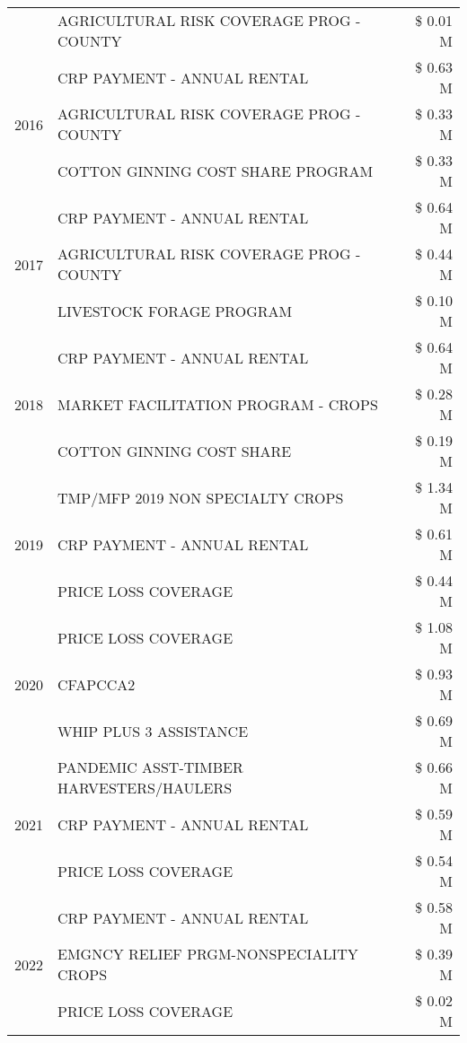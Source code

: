 \begin{tabular}{llr}
 & AGRICULTURAL RISK COVERAGE PROG - COUNTY & \$ 0.01 M \\
\cline{1-3}
\multirow[t]{3}{*}{2016} & CRP PAYMENT - ANNUAL RENTAL & \$ 0.63 M \\
 & AGRICULTURAL RISK COVERAGE PROG - COUNTY & \$ 0.33 M \\
 & COTTON GINNING COST SHARE PROGRAM & \$ 0.33 M \\
\cline{1-3}
\multirow[t]{3}{*}{2017} & CRP PAYMENT - ANNUAL RENTAL & \$ 0.64 M \\
 & AGRICULTURAL RISK COVERAGE PROG - COUNTY & \$ 0.44 M \\
 & LIVESTOCK FORAGE PROGRAM & \$ 0.10 M \\
\cline{1-3}
\multirow[t]{3}{*}{2018} & CRP PAYMENT - ANNUAL RENTAL & \$ 0.64 M \\
 & MARKET FACILITATION PROGRAM - CROPS & \$ 0.28 M \\
 & COTTON GINNING COST SHARE & \$ 0.19 M \\
\cline{1-3}
\multirow[t]{3}{*}{2019} & TMP/MFP 2019 NON SPECIALTY CROPS & \$ 1.34 M \\
 & CRP PAYMENT - ANNUAL RENTAL & \$ 0.61 M \\
 & PRICE LOSS COVERAGE & \$ 0.44 M \\
\cline{1-3}
\multirow[t]{3}{*}{2020} & PRICE LOSS COVERAGE & \$ 1.08 M \\
 & CFAPCCA2 & \$ 0.93 M \\
 & WHIP PLUS 3 ASSISTANCE & \$ 0.69 M \\
\cline{1-3}
\multirow[t]{3}{*}{2021} & PANDEMIC ASST-TIMBER HARVESTERS/HAULERS & \$ 0.66 M \\
 & CRP PAYMENT - ANNUAL RENTAL & \$ 0.59 M \\
 & PRICE LOSS COVERAGE & \$ 0.54 M \\
\cline{1-3}
\multirow[t]{3}{*}{2022} & CRP PAYMENT - ANNUAL RENTAL & \$ 0.58 M \\
 & EMGNCY RELIEF PRGM-NONSPECIALITY CROPS & \$ 0.39 M \\
 & PRICE LOSS COVERAGE & \$ 0.02 M \\
\cline{1-3}
\bottomrule
\end{tabular}
